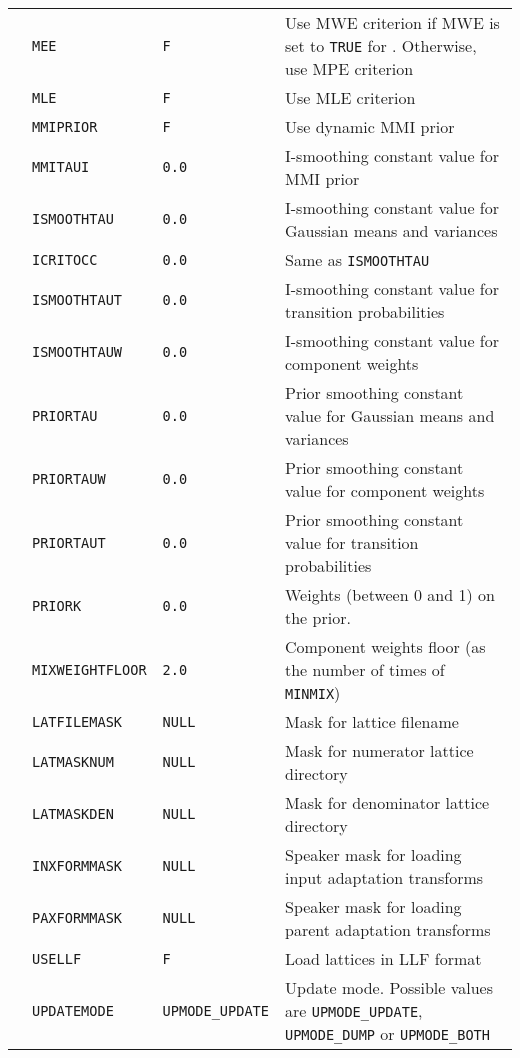 \begin{center}
\begin{supertabular}{|p{1.4cm}|l|l|p{6.6cm}|}
& \texttt{MEE} & \texttt{F} & Use MWE criterion if MWE is set to \texttt{TRUE} for . Otherwise, use MPE criterion \\ 
& \texttt{MLE} & \texttt{F} & Use MLE criterion \\ 
& \texttt{MMIPRIOR} & \texttt{F} & Use dynamic MMI prior \\ 
& \texttt{MMITAUI} & \texttt{0.0} & I-smoothing constant value for MMI prior \\ 
& \texttt{ISMOOTHTAU} & \texttt{0.0} & I-smoothing constant value for Gaussian means and variances \\ 
& \texttt{ICRITOCC} & \texttt{0.0} & Same as \texttt{ISMOOTHTAU} \\ 
& \texttt{ISMOOTHTAUT} & \texttt{0.0} & I-smoothing constant value for transition probabilities \\ 
& \texttt{ISMOOTHTAUW} & \texttt{0.0} & I-smoothing constant value for component weights \\ 
& \texttt{PRIORTAU} & \texttt{0.0} & Prior smoothing constant value for Gaussian means and variances \\ 
& \texttt{PRIORTAUW} & \texttt{0.0} & Prior smoothing constant value for component weights \\ 
& \texttt{PRIORTAUT} & \texttt{0.0} & Prior smoothing constant value for transition probabilities \\ 
& \texttt{PRIORK} & \texttt{0.0} & Weights (between 0 and 1) on the prior. \\ 
& \texttt{MIXWEIGHTFLOOR} & \texttt{2.0} & Component weights floor (as the number of times of \texttt{MINMIX}) \\ 
& \texttt{LATFILEMASK} & \texttt{NULL} & Mask for lattice filename \\ 
& \texttt{LATMASKNUM} & \texttt{NULL} & Mask for numerator lattice directory \\ 
& \texttt{LATMASKDEN} & \texttt{NULL} & Mask for denominator lattice directory \\ 
& \texttt{INXFORMMASK} & \texttt{NULL} & Speaker mask for loading input adaptation transforms \\ 
& \texttt{PAXFORMMASK} & \texttt{NULL} & Speaker mask for loading parent adaptation transforms \\ 
& \texttt{USELLF} & \texttt{F} & Load lattices in LLF format \\ 
& \texttt{UPDATEMODE} & \texttt{UPMODE\_UPDATE} & Update mode. Possible values are \texttt{UPMODE\_UPDATE}, \texttt{UPMODE\_DUMP} or \texttt{UPMODE\_BOTH}\\ \hline


\end{supertabular}
\end{center}
